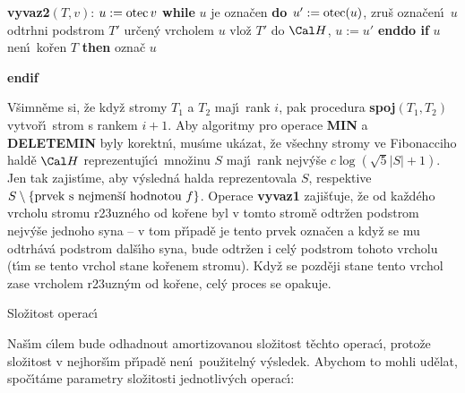 {\bf vyvaz2$(T,v)$}:\newline 
$u:=\operatorname{otec} v$\newline 
{\bf while} $u$ je ozna\v cen {\bf do\newline 
\phantom{{\rm ---}}$u':=\operatorname{otec}(u)$}, zru\v s ozna\v cen\'\i\ $u$\newline 
\phantom{---}odtrhni podstrom $T'$ ur\v cen\'y vrcholem $u$\newline 
\phantom{---}vlo\v z $T'$ do $\Cal H$, $u:=u'$\newline 
{\bf enddo\newline 
if} $u$ nen\'\i\ ko\v ren $T$ {\bf then} ozna\v c $u$ {\bf endif
\bigskip

}\flushpar V\v simn\v eme si, \v ze kdy\v z stromy $T_1$ a $T_2$ maj\'\i\ rank 
$i$, pak procedura {\bf spoj$(T_1,T_2)$} vytvo\v r\'\i\ strom s rankem 
$i+1$.  Aby algoritmy pro operace {\bf MIN} a {\bf DELETEMIN} byly 
korektn\'\i , mus\'\i me uk\'azat, \v ze v\v sechny stromy ve 
Fibonacciho hald\v e $\Cal H$ reprezentuj\'\i c\'\i\ mno\v zinu $
S$ maj\'\i\ rank 
nejv\'y\v se $c\log(\sqrt 5|S|+1)$. Jen tak zajist\'\i me, aby v\'ysledn\'a 
halda reprezentovala $S$, res\-pektive 
$S\setminus \{\text{\rm prvek s nejmen\v s\'\i\ hodnotou }f\}$.  Operace {\bf vyvaz1 }
zaji\v s\v tuje, \v ze od ka\v zd\'eho vrcholu stromu r\accent23uzn\'eho 
od ko\v rene byl v tomto strom\v e odtr\v zen podstrom nejv\'y\v se 
jednoho syna -- v tom p\v r\'\i pad\v e je tento prvek ozna\v cen a 
kdy\v z se mu odtrh\'av\'a podstrom dal\v s\'\i ho syna, bude odtr\v zen 
i cel\'y podstrom tohoto vrcholu (t\'\i m se tento vrchol stane ko\v renem 
stromu).  Kdy\v z se pozd\v eji stane tento vrchol zase 
vrcholem r\accent23uzn\'ym od ko\v rene, cel\'y proces se 
opakuje. 
\bigskip

\head
Slo\v zitost operac\'\i
\endhead

\flushpar Na\v s\'\i m c\'\i lem bude odhadnout amortizovanou slo\v zitost t\v echto 
operac\'\i , proto\v ze slo\v zitost v nejhor\v s\'\i m p\v r\'\i pad\v e nen\'\i\ 
pou\v ziteln\'y v\'ysledek.  Abychom to mohli ud\v elat, spo\v c\'\i t\'ame parametry 
slo\v zitosti jednotliv\'ych operac\'\i :  
\medskip


